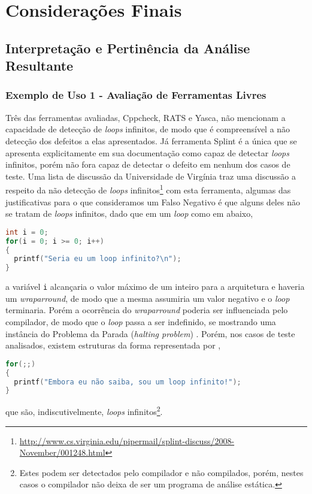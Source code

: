 \chapter*{Considerações Finais}\label{conclusoes}

\section*{Interpretação e Pertinência da Análise Resultante}

\subsection*{Exemplo de Uso 1 - Avaliação de Ferramentas Livres}

Três das ferramentas avaliadas, Cppcheck, RATS e Yasca, não mencionam a capacidade de detecção de \textit{loops} infinitos, de modo que é compreensível a não detecção dos defeitos a elas apresentados.  Já ferramenta Splint é a única que se apresenta explicitamente em sua documentação como capaz de detectar \textit{loops} infinitos, porém não fora capaz de detectar o defeito em nenhum dos casos de teste. Uma lista de discussão da Universidade de Virgínia traz uma discussão a respeito da não detecção de \textit{loops} infinitos\footnote{\url{http://www.cs.virginia.edu/pipermail/splint-discuss/2008-November/001248.html}} com esta ferramenta, algumas das justificativas para o que consideramos um Falso Negativo é que alguns deles não se tratam de \textit{loops} infinitos, dado que em um \textit{loop} como em  abaixo,
\begin{lstlisting}[language=C,caption=Exemplo de loop indefinido,label=undefined_for]
int i = 0;
for(i = 0; i >= 0; i++)
{
  printf("Seria eu um loop infinito?\n");
}
\end{lstlisting}
a variável \lstinline{i} alcançaria o valor máximo de um inteiro para a arquitetura e haveria um \textit{wraparround}, de modo que a mesma assumiria um valor negativo e o \textit{loop} terminaria. Porém a ocorrência do \textit{wraparround} poderia ser influenciada pelo compilador, de modo que o \textit{loop} passa a ser indefinido, se mostrando uma instância do Problema da Parada (\textit{halting problem}) \cite{turing}. Porém, nos casos de teste analisados, existem estruturas da forma representada por ,
\begin{lstlisting}[language=C, caption=Exemplo de loop infinito,label=infinite_for]
for(;;)
{
  printf("Embora eu não saiba, sou um loop infinito!");
}
\end{lstlisting}
que são, indiscutivelmente, \textit{loops} infinitos\footnote{Estes podem ser detectados pelo compilador e não compilados, porém, nestes casos o compilador não deixa de ser um programa de análise estática.}.

